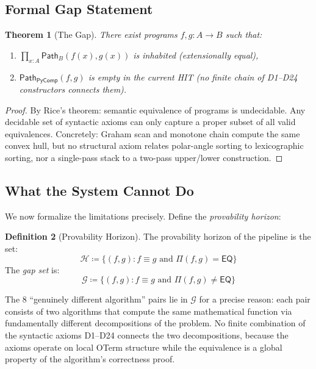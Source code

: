 \documentclass[11pt,a4paper]{report}
\theoremstyle{definition}
\newtheorem{definition}{Definition}[chapter]
\theoremstyle{plain}
\newtheorem{theorem}[definition]{Theorem}
\newcommand{\Path}{\mathsf{Path}}
\begin{document}
\subsection{Formal Gap Statement}

\begin{theorem}[The Gap]
\label{thm:gap}
There exist programs $f, g : A \to B$ such that:
\begin{enumerate}
  \item $\prod_{x:A} \Path_B(f(x), g(x))$ is inhabited
    (extensionally equal),
  \item $\Path_{\mathsf{PyComp}}(f, g)$ is empty in the current
    HIT (no finite chain of D1--D24 constructors connects them).
\end{enumerate}
\end{theorem}

\begin{proof}
By Rice's theorem: semantic equivalence of programs is undecidable.
Any decidable set of syntactic axioms can only capture a proper
subset of all valid equivalences.  Concretely: Graham scan and
monotone chain compute the same convex hull, but no structural
axiom relates polar-angle sorting to lexicographic sorting, nor
a single-pass stack to a two-pass upper/lower construction.
\end{proof}

\subsection{What the System Cannot Do}

We now formalize the limitations precisely.  Define the
\emph{provability horizon}:

\begin{definition}[Provability Horizon]
\label{def:provability-horizon}
The provability horizon of the pipeline is the set:
\[
  \mathcal{H} \coloneqq \bigl\{(f, g) : f \equiv g \text{ and }
  \Pi(f, g) = \mathsf{EQ}\bigr\}
\]
The \emph{gap set} is:
\[
  \mathcal{G} \coloneqq \bigl\{(f, g) : f \equiv g \text{ and }
  \Pi(f, g) \neq \mathsf{EQ}\bigr\}
\]
\end{definition}

The 8 ``genuinely different algorithm'' pairs lie in $\mathcal{G}$
for a precise reason: each pair consists of two algorithms that
compute the same mathematical function via fundamentally different
decompositions of the problem.  No finite combination of the
syntactic axioms D1--D24 connects the two decompositions, because
the axioms operate on local OTerm structure while the equivalence
is a global property of the algorithm's correctness proof.
\end{document}
